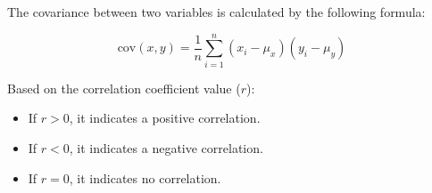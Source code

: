 \documentclass{article}
\begin{document}
The covariance between two variables is calculated by the following formula:

\[
\text{cov}(x,y) = \frac{1}{n}\sum_{i=1}^{n} (x_i - \mu_x)(y_i - \mu_y)
\]


Based on the correlation coefficient value ($r$):
\begin{itemize}
  \item If $r > 0$, it indicates a positive correlation.
  \item If $r < 0$, it indicates a negative correlation.
  \item If $r = 0$, it indicates no correlation.
\end{itemize}
\end{document}
